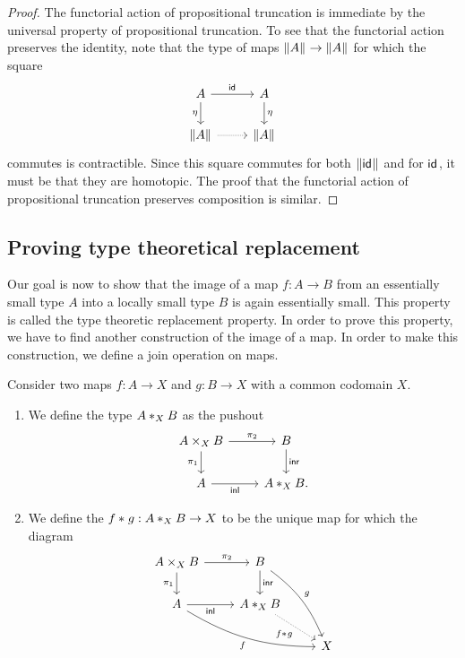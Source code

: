 \begin{proof}
  The functorial action of propositional truncation is immediate by the universal property of propositional truncation. To see that the functorial action preserves the identity, note that the type of maps $\brck{A}\to\brck{A}$ for which the square
  \begin{equation*}
    \begin{tikzcd}
      A \arrow[r,"\idfunc"] \arrow[d,swap,"\eta"] & A \arrow[d,"\eta"] \\
      \brck{A} \arrow[r,densely dotted] & \brck{A}
    \end{tikzcd}
  \end{equation*}
  commutes is contractible. Since this square commutes for both $\brck{\idfunc}$ and for $\idfunc$, it must be that they are homotopic. The proof that the functorial action of propositional truncation preserves composition is similar.
\end{proof}

\subsection{Proving type theoretical replacement}

Our goal is now to show that the image of a map $f:A\to B$ from an essentially small type $A$ into a locally small type $B$ is again essentially small. This property is called the type theoretic replacement property. In order to prove this property, we have to find another construction of the image of a map. In order to make this construction, we define a join operation on maps.

\begin{defn}
  Consider two maps $f:A\to X$ and $g:B\to X$ with a common codomain $X$.
  \begin{enumerate}
  \item We define the type $\join[X]{A}{B}$ as the pushout
    \begin{equation*}
      \begin{tikzcd}
        A\times_X B \arrow[r,"\pi_2"] \arrow[d,swap,"\pi_1"] & B \arrow[d,"\inr"] \\
        A \arrow[r,swap,"\inl"] & \join[X]{A}{B}.
      \end{tikzcd}
    \end{equation*}
  \item We define the  $\join{f}{g}:\join[X]{A}{B}\to X$ to be the unique map for which the diagram
        \begin{equation*}
      \begin{tikzcd}
        A\times_X B \arrow[r,"\pi_2"] \arrow[d,swap,"\pi_1"] & B \arrow[d,"\inr"] \arrow[ddr,bend left=15,"g"] \\
        A \arrow[r,swap,"\inl"] \arrow[drr,bend right=15,swap,"f"]  & \join[X]{A}{B} \arrow[dr,densely dotted,swap,"\join{f}{g}"] \\
        & & X
      \end{tikzcd}
    \end{equation*}
  \end{enumerate}
\end{defn}

